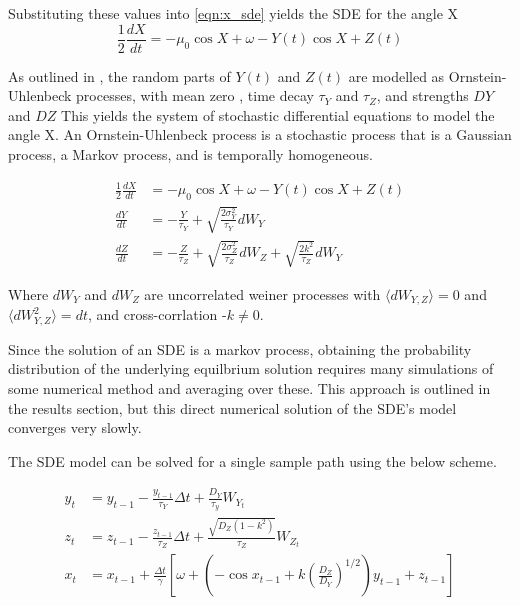 Substituting these values into \ref{eqn:x_sde} yields the SDE for the angle X
\begin{equation}
  \label{eqn:x_sde1}
 \frac{1}{2}\frac{d X}{dt} = -\mu_{0} \cos X + \omega - Y(t) \cos X + Z(t)
\end{equation}

As outlined in \cite{main}, the random parts of $Y(t)$ and $Z(t)$ are modelled as Ornstein-Uhlenbeck processes, with mean zero , time decay $\tau_{Y}$ and $\tau_{Z}$, and strengths $D{Y}$ and $D{Z}$
This yields the system of stochastic differential equations to model the angle X.
An Ornstein-Uhlenbeck process is a stochastic process that is a Gaussian process, a Markov process, and is temporally homogeneous.

\begin{equation}
 \begin{aligned}
 \frac{1}{2}\frac{d X}{dt} &= -\mu_{0} \cos X + \omega - Y(t) \cos X + Z(t) \\ 
 \frac{d Y}{dt} &= -\frac{Y}{\tau_{Y}} + \sqrt{\frac{2\sigma^{2}_{Y}}{\tau_{Y}}}dW_{Y} \\ 
 \frac{d Z}{dt} &= -\frac{Z}{\tau_{Z}} + \sqrt{\frac{2\sigma^{2}_{Z}}{\tau_{Z}}}dW_{Z} + \sqrt{\frac{2k^{2}}{\tau_{Z}}}dW_{Y} 
\end{aligned}
\end{equation}

Where $dW_{Y}$ and $dW_{Z}$ are uncorrelated weiner processes with $\langle dW_{Y,Z} \rangle = 0$ and $\langle dW^{2}_{Y,Z} \rangle = dt$, and cross-corrlation -$k \neq 0$.

Since the solution of an SDE is a markov process, obtaining the probability distribution of the underlying equilbrium solution requires many simulations of some numerical method and averaging over these.
This approach is outlined in the results section, but this direct numerical solution of the SDE's model converges very slowly.

The SDE model can be solved for a single sample path using the below scheme.

\begin{equation}
\begin{aligned}
 \label{eqn:sde_model_numeric}
 y_{t} &= y_{t-1} - \frac{y_{t-1}}{\tau_{Y}}\Delta t + \frac{D_{Y}}{\tau_{y}}W_{Y_{t}} \\ 
 z_{t} &= z_{t-1} - \frac{z_{t-1}}{\tau_{Z}}\Delta t + \frac{\sqrt{D_{Z}(1-k^{2})}}{\tau_{Z}}W_{Z_{t}} \\ 
 x_{t} &= x_{t-1} + \frac{\Delta t}{\gamma}\left[\omega + \left(- \cos x_{t-1} + k\left(\frac{D_{Z}}{D_{Y}}\right)^{1/2} \right) y_{t-1} + z_{t-1} \right] 
\end{aligned}
\end{equation}

